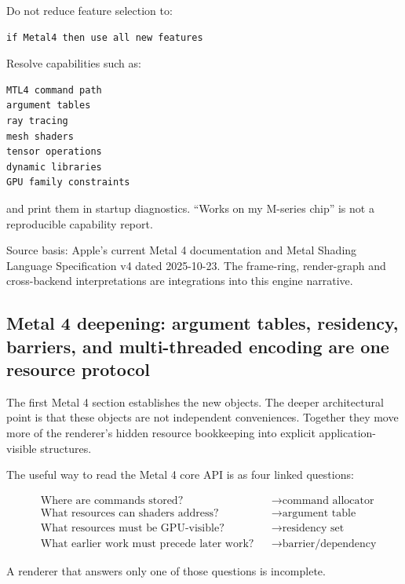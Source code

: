 Do not reduce feature selection to:

\begin{verbatim}
if Metal4 then use all new features
\end{verbatim}

Resolve capabilities such as:

\begin{verbatim}
MTL4 command path
argument tables
ray tracing
mesh shaders
tensor operations
dynamic libraries
GPU family constraints
\end{verbatim}

and print them in startup diagnostics. ``Works on my M-series chip'' is not a reproducible capability report.

Source basis: Apple's current Metal 4 documentation and Metal Shading Language Specification v4 dated 2025-10-23. The frame-ring, render-graph and cross-backend interpretations are integrations into this engine narrative.

\subsection{Metal 4 deepening: argument tables, residency, barriers, and multi-threaded encoding are one resource protocol}\label{05-engine-i-ch022-metal-4-deepening-argument-tables-residency-barriers-and-multi-threaded-encoding-are-one-resource-protocol}

The first Metal 4 section establishes the new objects. The deeper architectural point is that these objects are not independent conveniences. Together they move more of the renderer's hidden resource bookkeeping into explicit application-visible structures.

The useful way to read the Metal 4 core API is as four linked questions:

\[
\boxed{
\begin{aligned}
&\text{Where are commands stored?} &&\rightarrow \text{command allocator}\\
&\text{What resources can shaders address?} &&\rightarrow \text{argument table}\\
&\text{What resources must be GPU-visible?} &&\rightarrow \text{residency set}\\
&\text{What earlier work must precede later work?} &&\rightarrow \text{barrier/dependency}
\end{aligned}
}
\]

A renderer that answers only one of those questions is incomplete.

